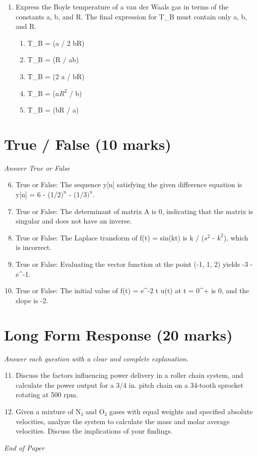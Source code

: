 \documentclass[12pt]{article}
\begin{document}
\begin{enumerate}[label=\arabic*.]
\begin{enumerate}[label=(\alph*)]
    \item It uses centre zero galvanometer instead of voltmeter.
    \item It uses an ammeter instead of a voltmeter.
\end{enumerate}
\item Express the Boyle temperature of a van der Waals gas in terms of the constants a, b, and R. The final expression for T\_B must contain only a, b, and R.
\begin{enumerate}[label=(\alph*)]
    \item T\_B = (a / 2 bR)
    \item T\_B = (R / ab)
    \item T\_B = (2 a / bR)
    \item T\_B = ($aR^2$ / b)
    \item T\_B = (bR / a)
\end{enumerate}
\end{enumerate}

\section*{True / False (10 marks)}
\textit{Answer True or False}
\begin{enumerate}[label=\arabic*.]
\setcounter{enumi}{5}
\item True or False: The sequence y[n] satisfying the given difference equation is y[n] = 6 - (1/$2)^n$ - (1/$3)^n$.
\item True or False: The determinant of matrix A is 0, indicating that the matrix is singular and does not have an inverse.
\item True or False: The Laplace transform of f(t) = sin(kt) is k / ($s^2$ - $k^2$), which is incorrect.
\item True or False: Evaluating the vector function at the point (-1, 1, 2) yields -3 - e^-1.
\item True or False: The initial value of f(t) = e^-2 t u(t) at t = 0^+ is 0, and the slope is -2.
\end{enumerate}

\section*{Long Form Response (20 marks)}
\textit{Answer each question with a clear and complete explanation.}
\begin{enumerate}[label=\arabic*.]
\setcounter{enumi}{10}
\item Discuss the factors influencing power delivery in a roller chain system, and calculate the power output for a 3/4 in. pitch chain on a 34-tooth sprocket rotating at 500 rpm.
\item Given a mixture of N₂ and O₂ gases with equal weights and specified absolute velocities, analyze the system to calculate the mass and molar average velocities. Discuss the implications of your findings.
\end{enumerate}

\vfill
\noindent\textit{End of Paper}
\end{document}
